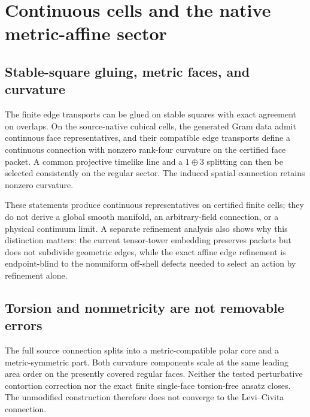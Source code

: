 \section{Continuous cells and the native metric-affine sector}

\subsection{Stable-square gluing, metric faces, and curvature}

The finite edge transports can be glued on stable squares with exact agreement on overlaps. On the source-native cubical cells, the generated Gram data admit continuous face representatives, and their compatible edge transports define a continuous connection with nonzero rank-four curvature on the certified face packet. A common projective timelike line and a $1\oplus3$ splitting can then be selected consistently on the regular sector. The induced spatial connection retains nonzero curvature.

These statements produce continuous representatives on certified finite cells; they do not derive a global smooth manifold, an arbitrary-field connection, or a physical continuum limit. A separate refinement analysis also shows why this distinction matters: the current tensor-tower embedding preserves packets but does not subdivide geometric edges, while the exact affine edge refinement is endpoint-blind to the nonuniform off-shell defects needed to select an action by refinement alone.

\subsection{Torsion and nonmetricity are not removable errors}

The full source connection splits into a metric-compatible polar core and a metric-symmetric part. Both curvature components scale at the same leading area order on the presently covered regular faces. Neither the tested perturbative contortion correction nor the exact finite single-face torsion-free ansatz closes. The unmodified construction therefore does not converge to the Levi--Civita connection.

